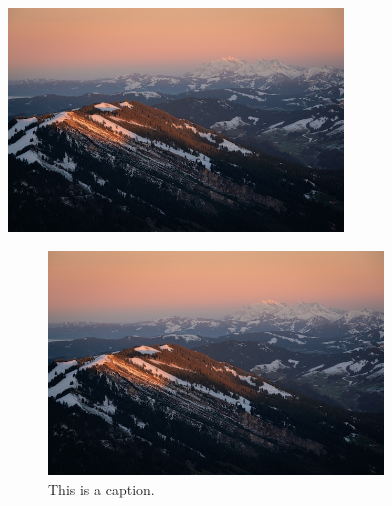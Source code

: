 \documentclass[10pt, letterpaper]{article}
\begin{document}
\begin{center}
    \includegraphics[width=3.5in]{1.jpg}
\end{center}

\begin{figure}[H]
    \centering
    \includegraphics[width=3.5in]{1.jpg}
    \caption{This is a caption.}
\end{figure}
\end{document}
